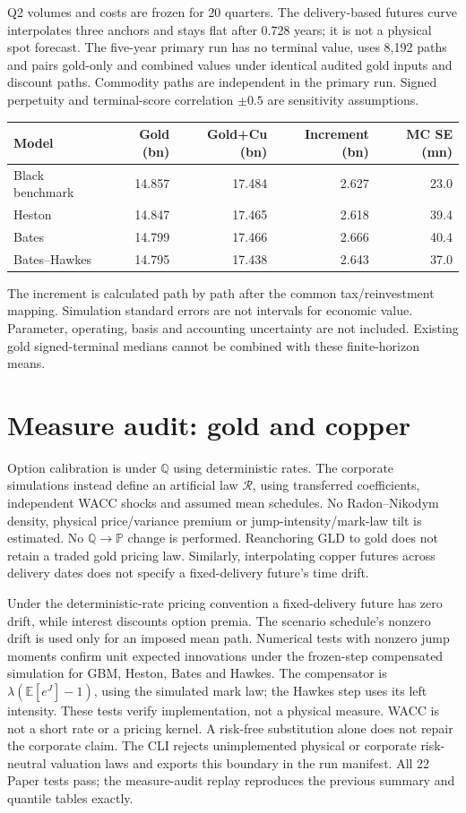 \documentclass[10pt,a4paper]{article}
\begin{document}
Q2 volumes and costs are frozen for 20 quarters. The delivery-based futures curve interpolates three anchors and stays flat after 0.728 years; it is not a physical spot forecast. The five-year primary run has no terminal value, uses 8,192 paths and pairs gold-only and combined values under identical audited gold inputs and discount paths. Commodity paths are independent in the primary run. Signed perpetuity and terminal-score correlation $\pm0.5$ are sensitivity assumptions.
\begin{center}\begin{tabular}{lrrrr}\toprule
Model & Gold (bn) & Gold+Cu (bn) & Increment (bn) & MC SE (mn) \\\midrule
Black benchmark & 14.857 & 17.484 & 2.627 & 23.0 \\
Heston & 14.847 & 17.465 & 2.618 & 39.4 \\
Bates & 14.799 & 17.466 & 2.666 & 40.4 \\
Bates--Hawkes & 14.795 & 17.438 & 2.643 & 37.0 \\
\bottomrule\end{tabular}\end{center}
The increment is calculated path by path after the common tax/reinvestment mapping. Simulation standard errors are not intervals for economic value. Parameter, operating, basis and accounting uncertainty are not included. Existing gold signed-terminal medians cannot be combined with these finite-horizon means.

\section{Measure audit: gold and copper}
Option calibration is under $\mathbb Q$ using deterministic rates. The corporate simulations instead define an artificial law $\mathcal R$, using transferred coefficients, independent WACC shocks and assumed mean schedules. No Radon--Nikodym density, physical price/variance premium or jump-intensity/mark-law tilt is estimated. No $\mathbb Q\to\mathbb P$ change is performed. Reanchoring GLD to gold does not retain a traded gold pricing law. Similarly, interpolating copper futures across delivery dates does not specify a fixed-delivery future's time drift.

Under the deterministic-rate pricing convention a fixed-delivery future has zero drift, while interest discounts option premia. The scenario schedule's nonzero drift is used only for an imposed mean path. Numerical tests with nonzero jump moments confirm unit expected innovations under the frozen-step compensated simulation for GBM, Heston, Bates and Hawkes. The compensator is $\lambda(\mathbb{E}[e^J]-1)$, using the simulated mark law; the Hawkes step uses its left intensity. These tests verify implementation, not a physical measure. WACC is not a short rate or a pricing kernel. A risk-free substitution alone does not repair the corporate claim. The CLI rejects unimplemented physical or corporate risk-neutral valuation laws and exports this boundary in the run manifest. All 22 Paper tests pass; the measure-audit replay reproduces the previous summary and quantile tables exactly.
\end{document}

